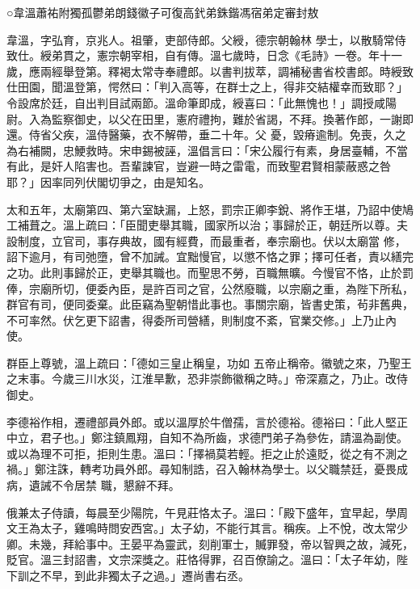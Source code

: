
\begin{pinyinscope}

 ○韋溫蕭祐附獨孤鬱弟朗錢徽子可復高釴弟銖鍇馮宿弟定審封敖



 韋溫，字弘育，京兆人。祖肇，吏部侍郎。父綬，德宗朝翰林
 學士，以散騎常侍致仕。綬弟貫之，憲宗朝宰相，自有傳。溫七歲時，日念《毛詩》一卷。年十一歲，應兩經舉登第。釋褐太常寺奉禮郎。以書判拔萃，調補秘書省校書郎。時綬致仕田園，聞溫登第，愕然曰：「判入高等，在群士之上，得非交結權幸而致耶？」令設席於廷，自出判目試兩節。溫命筆即成，綬喜曰：「此無愧也！」調授咸陽尉。入為監察御史，以父在田里，憲府禮拘，難於省謁，不拜。換著作郎，一謝即還。侍省父疾，溫侍醫藥，衣不解帶，垂二十年。父
 憂，毀瘠逾制。免喪，久之為右補闕，忠鯁救時。宋申錫被誣，溫倡言曰：「宋公履行有素，身居臺輔，不當有此，是奸人陷害也。吾輩諫官，豈避一時之雷電，而致聖君賢相蒙蔽惑之咎耶？」因率同列伏閣切爭之，由是知名。



 太和五年，太廟第四、第六室缺漏，上怒，罰宗正卿李銳、將作王堪，乃詔中使鳩工補葺之。溫上疏曰：「臣聞吏舉其職，國家所以治；事歸於正，朝廷所以尊。夫設制度，立官司，事存典故，國有經費，而最重者，奉宗廟也。伏以太廟當
 修，詔下逾月，有司弛墮，曾不加誡。宜黜慢官，以懲不恪之罪；擇可任者，責以繕完之功。此則事歸於正，吏舉其職也。而聖思不勞，百職無曠。今慢官不恪，止於罰俸，宗廟所切，便委內臣，是許百司之官，公然廢職，以宗廟之重，為陛下所私，群官有司，便同委棄。此臣竊為聖朝惜此事也。事關宗廟，皆書史策，茍非舊典，不可率然。伏乞更下詔書，得委所司營繕，則制度不紊，官業交修。」上乃止內使。



 群臣上尊號，溫上疏曰：「德如三皇止稱皇，功如
 五帝止稱帝。徽號之來，乃聖王之末事。今歲三川水災，江淮旱歉，恐非崇飾徽稱之時。」帝深嘉之，乃止。改侍御史。



 李德裕作相，遷禮部員外郎。或以溫厚於牛僧孺，言於德裕。德裕曰：「此人堅正中立，君子也。」鄭注鎮鳳翔，自知不為所齒，求德門弟子為參佐，請溫為副使。或以為理不可拒，拒則生患。溫曰：「擇禍莫若輕。拒之止於遠貶，從之有不測之禍。」鄭注誅，轉考功員外郎。尋知制誥，召入翰林為學士。以父職禁廷，憂畏成病，遺誡不令居禁
 職，懇辭不拜。



 俄兼太子侍讀，每晨至少陽院，午見莊恪太子。溫曰：「殿下盛年，宜早起，學周文王為太子，雞鳴時問安西宮。」太子幼，不能行其言。稱疾。上不悅，改太常少卿。未幾，拜給事中。王晏平為靈武，刻削軍士，贓罪發，帝以智興之故，減死，貶官。溫三封詔書，文宗深獎之。莊恪得罪，召百僚諭之。溫曰：「太子年幼，陛下訓之不早，到此非獨太子之過。」遷尚書右丞。




\end{pinyinscope}
